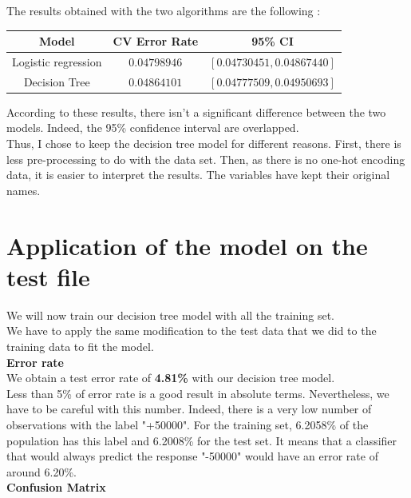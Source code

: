 \documentclass{article}
\begin{document}
\noindent The results obtained with the two algorithms are the following :\\

\begin{tabular}{c|c|c}
    Model & CV Error Rate & 95\% CI  \\
    \hline
    Logistic regression  & $0.04798946$ & $[0.04730451, 0.04867440]$ \\
    Decision Tree & $0.04864101 $ & $[0.04777509, 0.04950693]$\\
\end{tabular}

\vspace{0.5cm}
\noindent According to these results, there isn't a significant difference between the two models. Indeed, the 95\% confidence interval are overlapped. \\

\noindent Thus, I chose to keep the decision tree model for different reasons. First, there is less pre-processing to do with the data set. Then, as there is no one-hot encoding data, it is easier to interpret the results. The variables have kept their original names.
\newpage
\section{Application of the model on the test file}

We will now train our decision tree model with all the training set. \\
We have to apply the same modification to the test data that we did to the training data to fit the model.\\

\noindent\textbf{Error rate} \\

\noindent We obtain a test error rate of \textbf{4.81\%} with our decision tree model.\\

\noindent Less than 5\% of error rate is a good result in absolute terms. Nevertheless, we have to be careful with this number. Indeed, there is a very low number of observations with the label "+50000". For the training set, 6.2058\% of the population has this label and 6.2008\% for the test set. It means that a classifier that would always predict the response "-50000" would have an error rate of around 6.20\%.\\

\noindent\textbf{Confusion Matrix} \\
\end{document}
